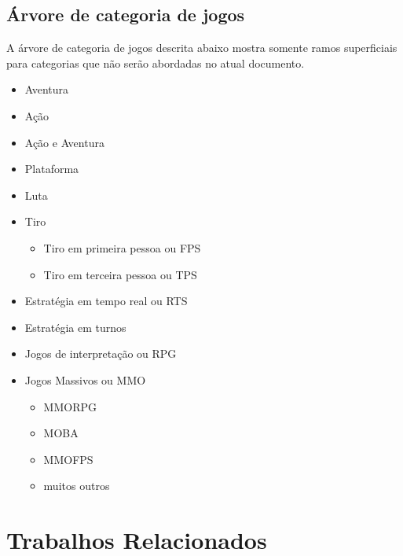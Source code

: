 \subsection{Árvore de categoria de jogos}
\label{sec:arvore_de_categoria_de_jogos}



A árvore de categoria de jogos descrita abaixo mostra somente ramos superficiais para categorias que não serão abordadas no atual documento.

\begin{itemize}
  \item Aventura
  \item Ação
  \item Ação e Aventura
  \item Plataforma
  \item Luta
  \item Tiro
    \begin{itemize}
      \item Tiro em primeira pessoa ou \ac{FPS}
      \item Tiro em terceira pessoa ou \ac{TPS}
    \end{itemize}
  \item Estratégia em tempo real ou \ac{RTS}
  \item Estratégia em turnos
  \item Jogos de interpretação ou \ac{RPG}
  \item Jogos Massivos ou \ac{MMO}
    \begin{itemize}
      \item \ac{MMORPG}
      \item \ac{MOBA}
      \item \ac{MMOFPS}
      \item muitos outros
    \end{itemize}
\end{itemize}

\section{Trabalhos Relacionados}
\label{sec:similares}
